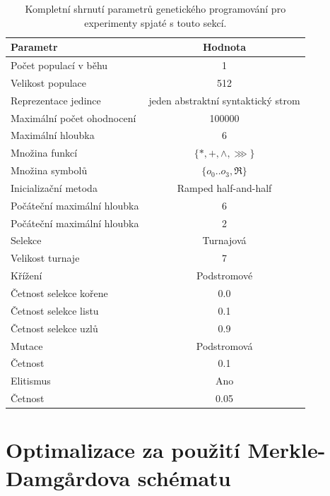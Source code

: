 \begin{table}[h]
	\centering
	\caption{Kompletní shrnutí parametrů genetického programování pro experimenty spjaté s touto sekcí.}
	\begin{tabular}{lc} \\ \hline
		Parametr & Hodnota \\ \hline
		Počet populací v běhu & 1 \\
		Velikost populace & 512 \\
		Reprezentace jedince & jeden abstraktní syntaktický strom \\ \hline
		Maximální počet ohodnocení & 100000 \\
		Maximální hloubka & 6 \\
		Množina funkcí & $\{*, +, \wedge, \ggg\}$ \\
		Množina symbolů & $\{o_{0} .. o_{3}, \Re \}$ \\
		\hline 
		Inicializační metoda & Ramped half-and-half \\
		Počáteční maximální hloubka & 6 \\
		Počáteční maximální hloubka & 2 \\
		\hline
		Selekce & Turnajová \\
		Velikost turnaje & 7 \\
		\hline
		Křížení & Podstromové \\
		Četnost selekce kořene & 0.0 \\
		Četnost selekce listu & 0.1 \\ 
		Četnost selekce uzlů & 0.9 \\
		\hline 
		Mutace & Podstromová \\
		Četnost & 0.1 \\
		\hline
		Elitismus & Ano \\
		Četnost & 0.05 \\
		\hline
	\end{tabular}
	\label{tab:IPHash_params}
\end{table}

\section{Optimalizace za použití Merkle-Damg\r{a}rdova schématu}

